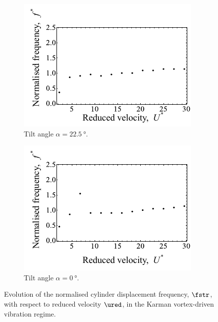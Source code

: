 \documentclass[a4paper,fleqn]{cas-sc}
\begin{document}
\begin{figure}
  \centering
  \begin{subfigure}[h]{0.35\textwidth}
    \includegraphics[width=\textwidth]{figs/yStrFreq2}
    \caption{Tilt angle $\alpha = \SI{22.5}{\degree}$.}
    \label{fig:yStrFreq2}
  \end{subfigure}

  \begin{subfigure}[h]{0.35\textwidth}
    \includegraphics[width=\textwidth]{figs/yStrFreq1}
    \caption{Tilt angle $\alpha = \SI{0}{\degree}$.}
    \label{fig:yStrFreq1}
  \end{subfigure}
  \caption{Evolution of the normalised cylinder displacement frequency, $\fstr$, with respect to reduced velocity $\ured$, in the Karman vortex-driven vibration regime.} \label{fig:yStrFreqKarman}
\end{figure}
\end{document}
